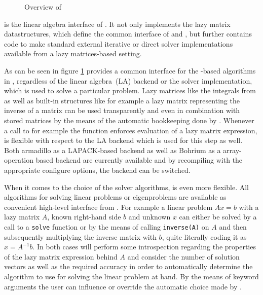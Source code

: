\begin{figure}
	\caption{Overview of \lazyten}
	\label{fig:lazyten}
\end{figure}



\lazyten is the linear algebra interface of \molsturm.
It not only implements the lazy matrix datastructures,
which define the common interface of \gint and \gscf,
but further contains code to make standard external
iterative or direct solver implementations available
from a lazy matrices-based setting.

As can be seen in figure \ref{fig:lazyten} \lazyten provides
a common interface for the \contraction-based algorithms in \gscf,
regardless of the linear algebra~(LA) backend or the solver implementation,
which is used to solve a particular problem.
Lazy matrices like the integrals from \gint as well as built-in structures
like for example a lazy matrix representing the inverse of a matrix
can be used transparently and even in combination with stored matrices
by the means of the automatic bookkeeping done by \lazyten.
Whenever a call to for example the \contraction function enforces
evaluation of a lazy matrix expression,
\lazyten is flexible with respect to the LA backend which is used for
this step as well.
Both armadillo as a LAPACK-based backend as well as Bohrium as a array-operation based backend
are currently available and by recompiling \molsturm with the appropriate configure options,
the backend can be switched.

When it comes to the choice of the solver algorithms, \lazyten is even more flexible.
All algorithms for solving linear problems or eigenproblems are available as 
convenient high-level interface from \gscf.
For example a linear problem $A x = b$ with a lazy matrix $A$, known right-hand side $b$
and unknown $x$ can either be solved by a call to a \texttt{solve} function or by
the means of calling \texttt{inverse(A)} on $A$ and then subsequently
multiplying the inverse matrix with $b$, quite literally coding it as $x = A^{-1} b$.
In both cases \lazyten will perform some introspection regarding the properties of
the lazy matrix expression behind $A$ and consider the number of solution
vectors as well as the required accuracy in order to automatically determine the algorithm to use
for solving the linear problem at hand.
By the means of keyword arguments the user can influence or override the automatic
choice made by \lazyten.

